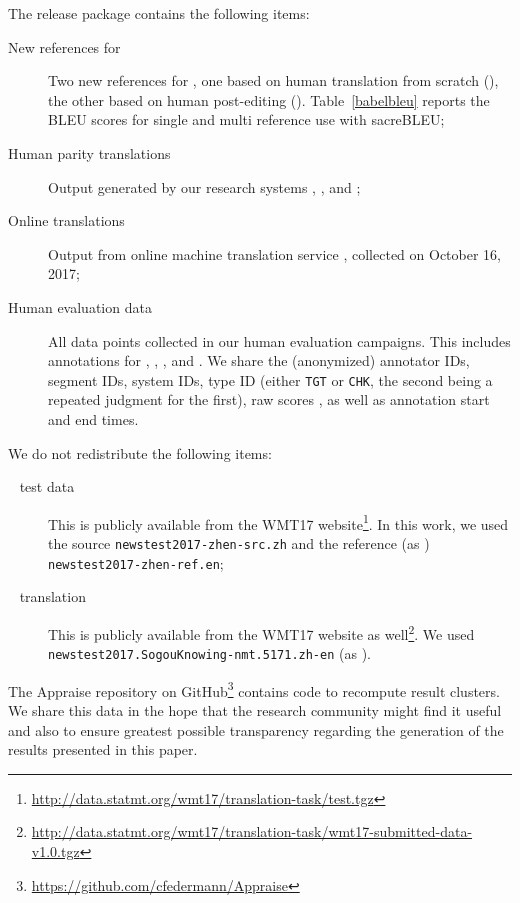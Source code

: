 \documentclass[a4paper]{article}
\begin{document}
\begin{CJK*}{UTF8}{gbsn}
The release package contains the following items:

\begin{description}
\item[New references for \newstest] Two new references for \newstest, one based on human translation from scratch (\RefHT), the other based on human post-editing (\RefPE). Table~\ref{babelbleu} reports the BLEU scores for single and multi reference use with sacreBLEU;

\item[Human parity translations] Output generated by our research systems \ComboA, \ComboB, and \ComboC;

\item[Online translations] Output from online machine translation service \Microsoft, collected on October 16, 2017;

\item[Human evaluation data] All data points collected in our human evaluation campaigns. This includes annotations for \SubsetB, \SubsetC, \SubsetD, and \SubsetE. We share the (anonymized) annotator IDs, segment IDs, system IDs, type ID (either \texttt{TGT} or \texttt{CHK}, the second being a repeated judgment for the first), raw scores , as well as annotation start and end times.
\end{description}

We do not redistribute the following items:

\begin{description}
\item[\RefWMT~ test data] This is publicly available from the WMT17 website\footnote{\url{http://data.statmt.org/wmt17/translation-task/test.tgz}}. In this work, we used the source \texttt{newstest2017-zhen-src.zh} and the reference (as \RefWMT) \texttt{newstest2017-zhen-ref.en};

\item[\Sogou~ translation] This is publicly available from the WMT17 website as well\footnote{\url{http://data.statmt.org/wmt17/translation-task/wmt17-submitted-data-v1.0.tgz}}. We used \texttt{newstest2017.SogouKnowing-nmt.5171.zh-en} (as \Sogou).
\end{description}

The Appraise repository on GitHub\footnote{\url{https://github.com/cfedermann/Appraise}} contains code to recompute result clusters. We share this data in the hope that the research community might find it useful and also to ensure greatest possible transparency regarding the generation of the results presented in this paper.
 

\end{CJK*}
\end{document}
